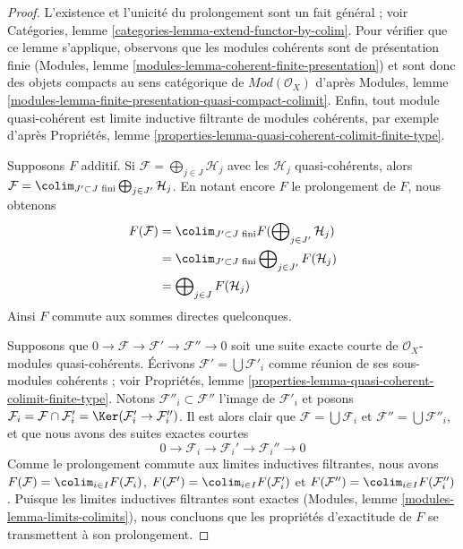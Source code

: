 \begin{proof}
L'existence et l'unicité du prolongement sont un fait général ; voir
Catégories, lemme \ref{categories-lemma-extend-functor-by-colim}.
Pour vérifier que ce lemme s'applique, observons que les modules cohérents
sont de présentation finie (Modules, lemme
\ref{modules-lemma-coherent-finite-presentation}) et sont donc des objets
compacts au sens catégorique de $\textit{Mod}(\mathcal{O}_X)$ d'après
Modules, lemme \ref{modules-lemma-finite-presentation-quasi-compact-colimit}.
Enfin, tout module quasi-cohérent est limite inductive filtrante de modules
cohérents, par exemple d'après Propriétés, lemme
\ref{properties-lemma-quasi-coherent-colimit-finite-type}.

\medskip\noindent
Supposons $F$ additif. Si
$\mathcal{F} = \bigoplus_{j \in J} \mathcal{H}_j$
avec les $\mathcal{H}_j$ quasi-cohérents, alors
$\mathcal{F} = \colim_{J' \subset J\text{ fini}}
\bigoplus_{j \in J'} \mathcal{H}_j$.
En notant encore $F$ le prolongement de $F$, nous obtenons
\begin{align*}
F(\mathcal{F})
& =
\colim_{J' \subset J\text{ fini}}
F(\bigoplus\nolimits_{j \in J'} \mathcal{H}_j) \\
& =
\colim_{J' \subset J\text{ fini}}
\bigoplus\nolimits_{j \in J'} F(\mathcal{H}_j) \\
& =
\bigoplus\nolimits_{j \in J} F(\mathcal{H}_j)
\end{align*}
Ainsi $F$ commute aux sommes directes quelconques.

\medskip\noindent
Supposons que
$0 \to \mathcal{F} \to \mathcal{F}' \to \mathcal{F}'' \to 0$
soit une suite exacte courte de $\mathcal{O}_X$-modules quasi-cohérents.
Écrivons $\mathcal{F}' = \bigcup \mathcal{F}'_i$ comme réunion de ses
sous-modules cohérents ; voir Propriétés, lemme
\ref{properties-lemma-quasi-coherent-colimit-finite-type}.
Notons $\mathcal{F}''_i \subset \mathcal{F}''$ l'image de $\mathcal{F}'_i$
et posons $\mathcal{F}_i = \mathcal{F} \cap \mathcal{F}'_i =
\Ker(\mathcal{F}'_i \to \mathcal{F}''_i)$. Il est alors clair que
$\mathcal{F} = \bigcup \mathcal{F}_i$ et
$\mathcal{F}'' = \bigcup \mathcal{F}''_i$, et que nous avons des suites
exactes courtes
$$
0 \to \mathcal{F}_i \to \mathcal{F}_i' \to \mathcal{F}_i'' \to 0
$$
Comme le prolongement commute aux limites inductives filtrantes, nous avons
$F(\mathcal{F}) = \colim_{i \in I} F(\mathcal{F}_i)$,
$F(\mathcal{F}') = \colim_{i \in I} F(\mathcal{F}'_i)$ et
$F(\mathcal{F}'') = \colim_{i \in I} F(\mathcal{F}''_i)$.
Puisque les limites inductives filtrantes sont exactes
(Modules, lemme \ref{modules-lemma-limits-colimits}), nous concluons que les
propriétés d'exactitude de $F$ se transmettent à son prolongement.
\end{proof}

